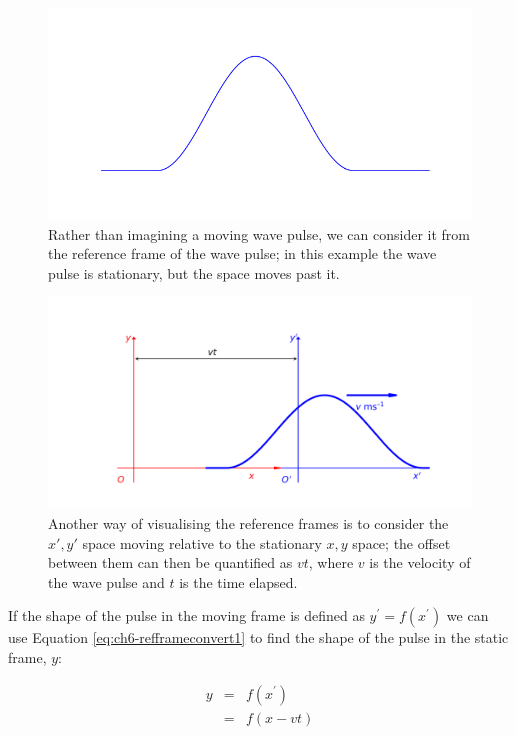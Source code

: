 \documentclass[
]{book}
\begin{document}
\begin{figure}

{\centering \includegraphics[width=0.7\linewidth]{visualisations/ch6-wavepulse2} 

}

\caption{Rather than imagining a moving wave pulse, we can consider it from the reference frame of the wave pulse; in this example the wave pulse is stationary, but the space moves past it.}\label{fig:ch6-referenceframes1}
\end{figure}

\begin{figure}

{\centering \includegraphics[width=0.7\linewidth]{visualisations/ch6-wavepulse3} 

}

\caption{Another way of visualising the reference frames is to consider the $x',y'$ space moving relative to the stationary $x,y$ space; the offset between them can then be quantified as $vt$, where $v$ is the velocity of the wave pulse and $t$ is the time elapsed.}\label{fig:ch6-referenceframes2}
\end{figure}

If the shape of the pulse in the moving frame is defined as \(y^\prime = f(x^\prime)\) we can use Equation \eqref{eq:ch6-refframeconvert1} to find the shape of the pulse in the static frame, \(y\):

\begin{equation}
\begin{array}{rcl}
y &=& f(x^\prime)\\
&=& f(x - vt)
\end{array}
\label{eq:ch6-refframeconvert2}
\end{equation}
\end{document}
